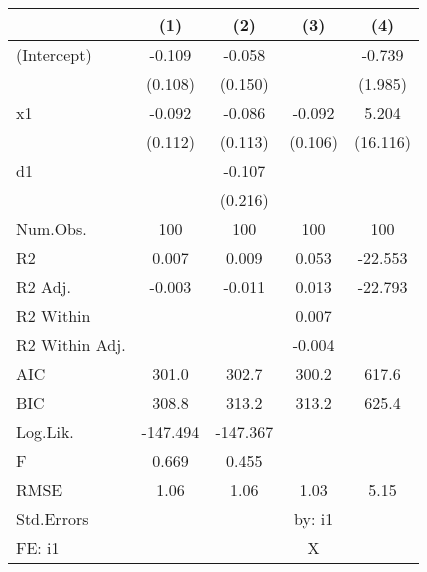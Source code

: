\begin{table}
\centering
\begin{tabular}[t]{lcccc}
\toprule
  & (1) & (2) & (3) & (4)\\
\midrule
(Intercept) & -0.109 & -0.058 &  & -0.739\\
 & (0.108) & (0.150) &  & (1.985)\\
x1 & -0.092 & -0.086 & -0.092 & 5.204\\
 & (0.112) & (0.113) & (0.106) & (16.116)\\
d1 &  & -0.107 &  & \\
 &  & (0.216) &  & \\
\midrule
Num.Obs. & 100 & 100 & 100 & 100\\
R2 & 0.007 & 0.009 & 0.053 & -22.553\\
R2 Adj. & -0.003 & -0.011 & 0.013 & -22.793\\
R2 Within &  &  & 0.007 & \\
R2 Within Adj. &  &  & -0.004 & \\
AIC & 301.0 & 302.7 & 300.2 & 617.6\\
BIC & 308.8 & 313.2 & 313.2 & 625.4\\
Log.Lik. & -147.494 & -147.367 &  & \\
F & 0.669 & 0.455 &  & \\
RMSE & 1.06 & 1.06 & 1.03 & 5.15\\
Std.Errors &  &  & by: i1 & \\
FE: i1 &  &  & X & \\
\bottomrule
\end{tabular}
\end{table}
